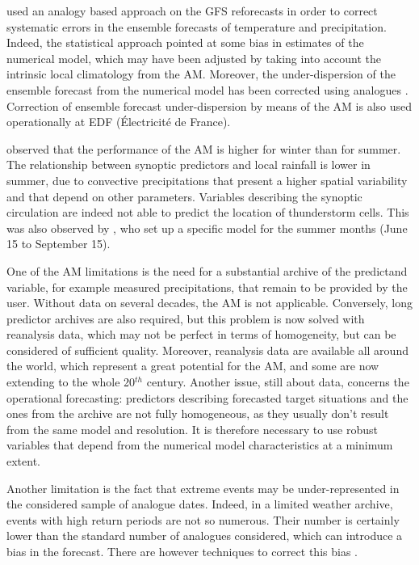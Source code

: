 \documentclass[review]{elsarticle}
\begin{document}
\citet{Hamill2006} used an analogy based approach on the GFS reforecasts in order to correct systematic errors in the ensemble forecasts of temperature and precipitation. Indeed, the statistical approach pointed at some bias in estimates of the numerical model, which may have been adjusted by taking into account the intrinsic local climatology from the AM. Moreover, the under-dispersion of the ensemble forecast from the numerical model has been corrected using analogues \citep{Hamill2006}. Correction of ensemble forecast under-dispersion by means of the AM is also used operationally at EDF (\'{E}lectricit\'{e} de France).

\citet{Bliefernicht2010} observed that the performance of the AM is higher for winter than for summer. The relationship between synoptic predictors and local rainfall is lower in summer, due to convective precipitations that present a higher spatial variability and that depend on other parameters. Variables describing the synoptic circulation are indeed not able to predict the location of thunderstorm cells. This was also observed by \citet{BenDaoud2010}, who set up a specific model for the summer months (June 15 to September 15).

One of the AM limitations is the need for a substantial archive of the predictand variable, for example measured precipitations, that remain to be provided by the user. Without data on several decades, the AM is not applicable. Conversely, long predictor archives are also required, but this problem is now solved with reanalysis data, which may not be perfect in terms of homogeneity, but can be considered of sufficient quality. Moreover,  reanalysis data are available all around the world, which represent a great potential for the AM, and some are now extending to the whole 20$^{th}$ century. Another issue, still about data, concerns the operational forecasting: predictors describing forecasted target situations and the ones from the archive are not fully homogeneous, as they usually don't result from the same model and resolution. It is therefore necessary to use robust variables that depend from the numerical model characteristics at a minimum extent.

Another limitation is the fact that extreme events may be under-represented in the considered sample of analogue dates. Indeed, in a limited weather archive, events with high return periods are not so numerous. Their number is certainly lower than the standard number of analogues considered, which can introduce a bias in the forecast. There are however techniques to correct this bias \citep[see][]{Marty2010}.
\end{document}
